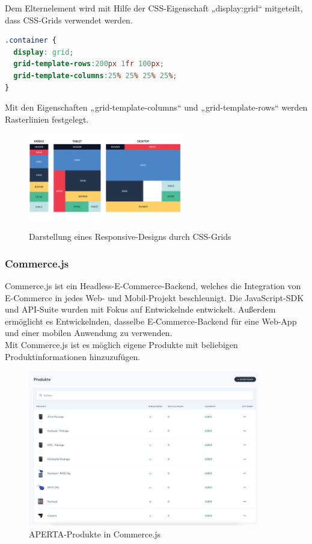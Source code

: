 Dem Elternelement wird mit Hilfe der CSS-Eigenschaft „display:grid“ mitgeteilt, dass CSS-Grids verwendet werden. 

\begin{lstlisting}[language=CSS, caption=CSS-Code zur Aktivierung des Grids, label=lst:impl:gridCSS]
.container { 
  display: grid; 
  grid-template-rows:200px 1fr 100px; 
  grid-template-columns:25% 25% 25% 25%; 
}
\end{lstlisting} \cite{cssgrid}

Mit den Eigenschaften „grid-template-columns“ und „grid-template-rows“ werden Rasterlinien festgelegt.
\cite{cssgrid}

\begin{figure}[H]
  \centering
  \includegraphics[width=0.6\textwidth]{pics/cssGridDarstellung.jpg}
  \caption{Darstellung eines Responsive-Designs durch CSS-Grids}
  \cite{cssgridDarstellung}
\end{figure}


\subsubsection{Commerce.js}

Commerce.js ist ein Headless-E-Commerce-Backend, welches die Integration von E-Commerce in jedes Web- und Mobil-Projekt beschleunigt. Die JavaScript-SDK und API-Suite wurden mit Fokus auf Entwickelnde entwickelt. Außerdem ermöglicht es Entwickelnden, dasselbe E-Commerce-Backend für eine Web-App und einer mobilen Anwendung zu verwenden.
\cite{commerceJS}\\

Mit Commerce.js ist es möglich eigene Produkte mit beliebigen Produktinformationen hinzuzufügen.

\begin{figure}[H]
  \centering
  \includegraphics[width=0.9\textwidth]{pics/apertaProdukteCommerce.png}
  \caption{APERTA-Produkte in Commerce.js}
\end{figure}

